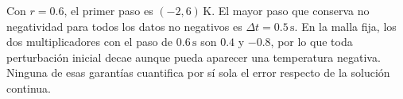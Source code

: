 Con \(r=0.6\), el primer paso es \((-2,6)\,\mathrm K\). El mayor paso que conserva no negatividad para todos los datos no negativos es \(\Delta t=0.5\,\mathrm s\). En la malla fija, los dos multiplicadores con el paso de \(0.6\,\mathrm s\) son \(0.4\) y \(-0.8\), por lo que toda perturbación inicial decae aunque pueda aparecer una temperatura negativa. Ninguna de esas garantías cuantifica por sí sola el error respecto de la solución continua.
